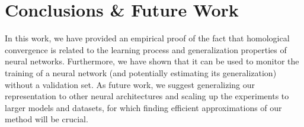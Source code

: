 \documentclass{article}
\begin{document}
\section{Conclusions \& Future Work}
\label{sec:conclusions}
In this work, we have provided an empirical proof of the fact that homological convergence is related to the learning process and generalization properties of neural networks. Furthermore, we have shown that it can be used to monitor the training of a neural network (and potentially estimating its generalization) without a validation set. As future work, we suggest generalizing our representation to other neural architectures and scaling up the experiments to larger models and datasets, for which finding efficient approximations of our method will be crucial. %


\end{document}
